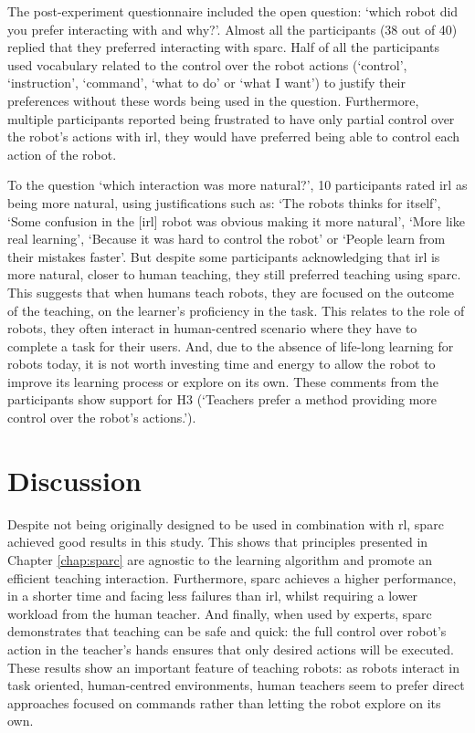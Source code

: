 The post-experiment questionnaire included the open question: `which robot did you prefer interacting with and why?'. Almost all the participants (38 out of 40) replied that they preferred interacting with \gls{sparc}. Half of all the participants used vocabulary related to the control over the robot actions (`control', `instruction', `command', `what to do' or `what I want') to justify their preferences without these words being used in the question. Furthermore, multiple participants reported being frustrated to have only partial control over the robot's actions with \gls{irl}, they would have preferred being able to control each action of the robot. 

To the question `which interaction was more natural?', 10 participants rated \gls{irl} as being more natural, using justifications such as: `The robots thinks for itself', `Some confusion in the [\gls{irl}] robot was obvious making it more natural', `More like real learning', `Because it was hard to control the robot' or `People learn from their mistakes faster'. But despite some participants acknowledging that \gls{irl} is more natural, closer to human teaching, they still preferred teaching using \gls{sparc}. This suggests that when humans teach robots, they are focused on the outcome of the teaching, on the learner's proficiency in the task. This relates to the role of robots, they often interact in human-centred scenario where they have to complete a task for their users. And, due to the absence of life-long learning for robots today, it is not worth investing time and energy to allow the robot to improve its learning process or explore on its own. These comments from the participants show support for H3 (`Teachers prefer a method providing more control over the robot's actions.').

\section{Discussion}
\label{sec:control_discussion}

Despite not being originally designed to be used in combination with \acrlong{rl}, \gls{sparc} achieved good results in this study. This shows that principles presented in Chapter \ref{chap:sparc} are agnostic to the learning algorithm and promote an efficient teaching interaction. Furthermore, \gls{sparc} achieves a higher performance, in a shorter time and facing less failures than \gls{irl}, whilst requiring a lower workload from the human teacher. And finally, when used by experts, \gls{sparc} demonstrates that teaching can be safe and quick: the full control over robot's action in the teacher's hands ensures that only desired actions will be executed. These results show an important feature of teaching robots: as robots interact in task oriented, human-centred environments, human teachers seem to prefer direct approaches focused on commands rather than letting the robot explore on its own.

